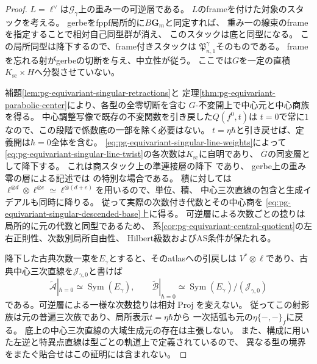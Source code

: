 \begin{proof}
$L=\ell^\vee$は$\mathcal G_\gamma$上の重み一の可逆層である。
$L$のframeを付けた対象のスタックを考える。
gerbeをfppf局所的に$B\mathbf G_m$と同定すれば、
重み一の線束のframeを指定することで相対自己同型群が消え、
このスタックは底と同型になる。
この局所同型は降下するので、frame付きスタックは
$\mathfrak P_{n,1}^\gamma$そのものである。
frameを忘れる射がgerbeの切断を与え、中立性が従う。
ここでは$G$を一定の直積$K_{\mathrm{sc}}\times H$へ分裂させていない。

補題\ref{lem:pg-equivariant-singular-retractions}と
定理\ref{thm:pg-equivariant-parabolic-center}により、各型の全零切断を含む
$G$-不変開上で中心元と中心商族を得る。
中心調整写像で既存の不変関数を引き戻した$Q(f^0,t)$は
$t=0$で常に$1$なので、この段階で係数底の一部を除く必要はない。
$t=\eta\hbar$と引き戻せば、定義開は$\hbar=0$全体を含む。
\eqref{eq:pg-equivariant-singular-line-weights}によって
\eqref{eq:pg-equivariant-singular-line-twist}の各次数は$K_{\mathrm{sc}}$に自明であり、
$\overline G$の同変層として降下する。
これは商スタック上の準連接層の降下
\cite[Proposition~96.14.3, Tag~\texttt{06WT}]{PStacks}であり、
gerbe上の重み零の層による記述では
\cite[Proposition~4.10, p.~1487]{PBerghSchnurerGerbes}の特別な場合である。
積に対しては$\ell^{\otimes d}\otimes\ell^{\otimes e}
\simeq\ell^{\otimes(d+e)}$を用いるので、単位、積、
中心三次直線の包含と生成イデアルも同時に降りる。
従って実際の次数付き代数とその中心商を
\eqref{eq:pg-equivariant-singular-descended-base}上に得る。
可逆層による次数ごとの捻りは局所的に元の代数と同型であるため、
系\ref{cor:pg-equivariant-central-quotient}の左右正則性、次数別局所自由性、
Hilbert級数およびAS条件が保たれる。

降下した古典次数一束を$E_\gamma$とすると、そのatlasへの引戻しは
$V^*\otimes\ell$であり、古典中心三次直線を$\mathcal J_{\gamma,0}$と書けば
\begin{equation}
 \widetilde{\mathcal A}|_{\hbar=0}
 \simeq\operatorname{Sym}(E_\gamma),\qquad
 \widetilde{\mathcal B}|_{\hbar=0}
 \simeq\operatorname{Sym}(E_\gamma)/(\mathcal J_{\gamma,0})
 \label{eq:pg-equivariant-singular-classical-family}
\end{equation}
である。可逆層による一様な次数捻りは相対$\operatorname{Proj}$を変えない。
従ってこの射影族は元の普遍三次族であり、局所表示$t=\eta\hbar$から
一次括弧も元の$\eta\{-,-\}_f$に戻る。
底上の中心三次直線の大域生成元の存在は主張しない。
また、構成に用いた左逆と特異点直線は型ごとの軌道上で定義されているので、
異なる型の境界をまたぐ貼合せはこの証明には含まれない。
\end{proof}


